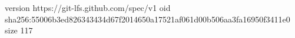 version https://git-lfs.github.com/spec/v1
oid sha256:55006b3ed826343434d67f2014650a17521af061d00b506aa3fa16950f3411e0
size 117
